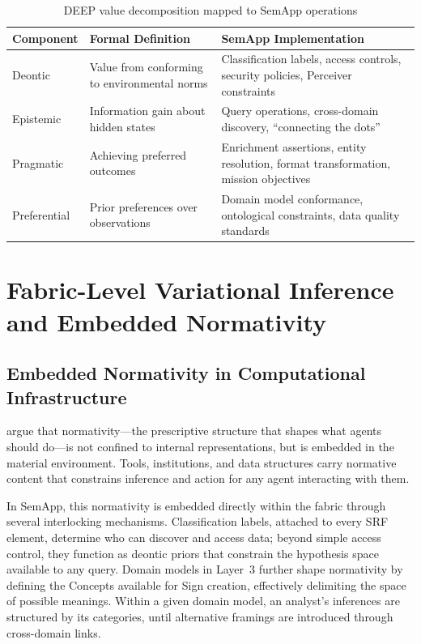 \documentclass[11pt,a4paper]{article}
\theoremstyle{definition}
\begin{document}
\begin{table}[H]
\centering
\caption{DEEP value decomposition mapped to SemApp operations}
\label{tab:deep}
\begin{tabular}{p{2.2cm}p{4.5cm}p{5.5cm}}
\toprule
\textbf{Component} & \textbf{Formal Definition} & \textbf{SemApp Implementation} \\
\midrule
Deontic & Value from conforming to environmental norms & Classification labels, access controls, security policies, Perceiver constraints \\
\addlinespace
Epistemic & Information gain about hidden states & Query operations, cross-domain discovery, ``connecting the dots'' \\
\addlinespace
Pragmatic & Achieving preferred outcomes & Enrichment assertions, entity resolution, format transformation, mission objectives \\
\addlinespace
Preferential & Prior preferences over observations & Domain model conformance, ontological constraints, data quality standards \\
\bottomrule
\end{tabular}
\end{table}


\section{Fabric-Level Variational Inference and Embedded Normativity}
\label{sec:fmaterial}

\subsection{Embedded Normativity in Computational Infrastructure}

\citet{guenincarlut2023embedded} argue that normativity---the prescriptive structure that shapes what agents should do---is not confined to internal representations, but is embedded in the material environment. Tools, institutions, and data structures carry normative content that constrains inference and action for any agent interacting with them.

In SemApp, this normativity is embedded directly within the fabric through several interlocking mechanisms. Classification labels, attached to every SRF element, determine who can discover and access data; beyond simple access control, they function as deontic priors that constrain the hypothesis space available to any query. Domain models in Layer~3 further shape normativity by defining the Concepts available for Sign creation, effectively delimiting the space of possible meanings. Within a given domain model, an analyst's inferences are structured by its categories, until alternative framings are introduced through cross-domain links.
\end{document}
